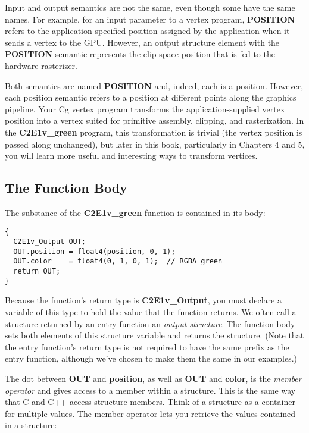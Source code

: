 \documentclass[../main.tex]{subfiles}
\begin{document}
Input and output semantics are not the same, even though some have the same names. For example, for an input parameter to a vertex program, \textbf{POSITION} refers to the application-specified position assigned by the application when it sends a vertex to the GPU. However, an output structure element with the \textbf{POSITION} semantic represents the clip-space position that is fed to the hardware rasterizer.

Both semantics are named \textbf{POSITION} and, indeed, each is a position. However, each position semantic refers to a position at different points along the graphics pipeline. Your Cg vertex program transforms the application-supplied vertex position into a vertex suited for primitive assembly, clipping, and rasterization. In the \textbf{C2E1v_green} program, this transformation is trivial (the vertex position is passed along unchanged), but later in this book, particularly in Chapters 4 and 5, you will learn more useful and interesting ways to transform vertices.

\subsection{The Function Body}

The substance of the \textbf{C2E1v_green} function is contained in its body:

\FloatBarrier
\begin{lstlisting}
{
  C2E1v_Output OUT;
  OUT.position = float4(position, 0, 1);
  OUT.color    = float4(0, 1, 0, 1);  // RGBA green
  return OUT;
}
\end{lstlisting}
\FloatBarrier

Because the function's return type is \textbf{C2E1v_Output}, you must declare a variable of this type to hold the value that the function returns. We often call a structure returned by an entry function an \textit{output structure}. The function body sets both elements of this structure variable and returns the structure. (Note that the entry function's return type is not required to have the same prefix as the entry function, although we've chosen to make them the same in our examples.)

The dot between \textbf{OUT} and \textbf{position}, as well as \textbf{OUT} and \textbf{color}, is the \textit{member operator} and gives access to a member within a structure. This is the same way that C and C++ access structure members. Think of a structure as a container for multiple values. The member operator lets you retrieve the values contained in a structure:
\end{document}
